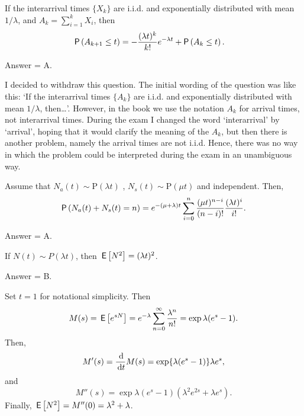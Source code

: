 \begin{exercise}[201703]
 If the interarrival times $\{X_k\}$ are i.i.d. and exponentially
 distributed with mean $1/\lambda$, and $A_k = \sum_{i=1}^k X_i$, then 
\begin{equation*}
 \begin{split}
\P{A_{k+1} \leq t} 
&= - \frac{(\lambda t)^{k}}{k!} e^{-\lambda t} + \P{A_k \leq t}.
 \end{split}
\end{equation*}
\begin{solution}
 Answer = A. 

 I decided to withdraw this question. The initial wording of the
 question was like this: `If the interarrival times $\{A_k\}$ are
 i.i.d. and exponentially distributed with mean $1/\lambda$,
 then\ldots'. However, in the book we use the notation $A_k$ for
 arrival times, not interarrival times. During the exam I changed
 the word `interarrival' by `arrival', hoping that it would clarify
 the meaning of the $A_k$, but then there is another problem,
 namely the arrival times are not i.i.d. Hence, there was no way
 in which the problem could be interpreted during the exam in an
 unambiguous way. 
\end{solution}
\end{exercise}

\begin{exercise}[201703] 
Assume that
 $N_a(t)\sim \text{P}(\lambda t)$ , $N_s(t) \sim \text{P}(\mu t)$ and
 independent. Then,
 \begin{equation*}
\P{N_a(t) + N_s(t) = n} 
= e^{-(\mu+\lambda)t} \sum_{i=0}^n \frac{(\mu t)^{n-i}}{(n-i)!} \frac{(\lambda t)^i}{i!}. \\
 \end{equation*}
\begin{solution}
 Answer = A.
\end{solution}
\end{exercise}


\begin{exercise}[201703]
 If $N(t)\sim P(\lambda t)$,
 then $\,\mathsf{E}\left[N^2\right]=(\lambda t)^2$.

\begin{solution}
Answer = B.

Set $t=1$ for notational simplicity. Then
\begin{equation*}
 M(s) = \,\mathsf{E}\left[e^{sN}\right] = e^{-\lambda}\sum_{n=0}^\infty \frac{\lambda^n}{n!} = \exp{\lambda(e^s-1)}.
\end{equation*}
Then, 
\begin{equation*}
 M'(s) = \frac{\d}{\d t} M(s) = \exp\{\lambda(e^s-1)\}\lambda e^s,
\end{equation*}
and 
\begin{equation*}
 M''(s) = \exp{\lambda(e^s-1)}(\lambda^2 e^{2s} + \lambda e^s).
\end{equation*}
Finally, 
$\,\mathsf{E}\left[N^2\right] = M''(0) = \lambda^2+\lambda$. 

\end{solution}
\end{exercise}


